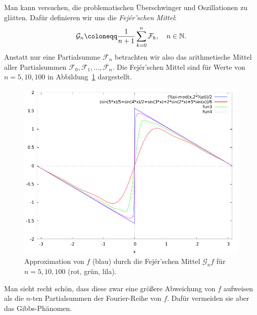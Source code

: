 \begin{example}
Man kann versuchen, die problematischen Überschwinger und Oszillationen zu glätten. Dafür definieren
wir uns die \emph{Fej\'{e}r'schen Mittel}:
\[
  \mathcal{G}_{n} \coloneqq \frac{1}{n + 1} \sum_{k = 0}^{n} \mathcal{F}_{k}, \quad n \in \N.
\]
Anstatt nur eine Partialsumme $ \mathcal{F}_{n} $ betrachten wir also das arithmetische Mittel 
aller Partialsummen $ \mathcal{F}_{0}, \mathcal{F}_{1}, \ldots, \mathcal{F}_{n} $. Die 
Fej\'{e}r'schen Mittel sind für Werte von $ n = 5, 10, 100 $ in Abbildung~\ref{fig:sawtooth_fejer}
dargestellt.
\begin{figure}[ht]
\centering
\includegraphics[width=0.7\linewidth]{Bilder/sawtooth_fejer}
\caption{Approximation von $ f $ (blau) durch die Fej\'{e}r'schen Mittel $ \mathcal{G}_{n}f $ für 
$ n = 5, 10, 100 $ (rot, grün, lila).}
\label{fig:sawtooth_fejer}
\end{figure}
Man sieht recht schön, dass diese zwar eine größere Abweichung von $ f $ aufweisen als die
$ n $-ten Partialsummen der Fourier-Reihe von $ f $. Dafür vermeiden sie aber das Gibbs-Phänomen.
\end{example}